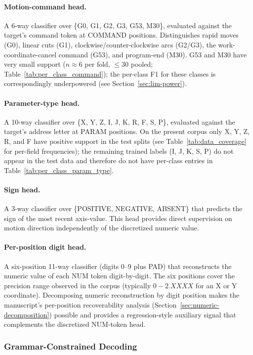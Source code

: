 \documentclass[sensors,article,submit,moreauthors,pdftex]{Definitions/mdpi}
\begin{document}
\paragraph{Motion-command head.} A 6-way classifier over \{G0, G1, G2, G3, G53, M30\}, evaluated against the target's command token at COMMAND positions. Distinguishes rapid moves (G0), linear cuts (G1), clockwise/counter-clockwise arcs (G2/G3), the work-coordinate-cancel command (G53), and program-end (M30). G53 and M30 have very small support ($n\!\approx\!6$ per fold, $\le\!30$ pooled; Table~\ref{tab:per_class_command}); the per-class F1 for these classes is correspondingly underpowered (see Section~\ref{sec:lim-power}).

\paragraph{Parameter-type head.} A 10-way classifier over \{X, Y, Z, I, J, K, R, F, S, P\}, evaluated against the target's address letter at PARAM positions. On the present corpus only X, Y, Z, R, and F have positive support in the test splits (see Table~\ref{tab:data_coverage} for per-field frequencies); the remaining trained labels (I, J, K, S, P) do not appear in the test data and therefore do not have per-class entries in Table~\ref{tab:per_class_param_type}.

\paragraph{Sign head.} A 3-way classifier over \{POSITIVE, NEGATIVE, ABSENT\} that predicts the sign of the most recent axis-value. This head provides direct supervision on motion direction independently of the discretized numeric value.

\paragraph{Per-position digit head.} A six-position 11-way classifier (digits 0--9 plus PAD) that reconstructs the numeric value of each NUM token digit-by-digit. The six positions cover the precision range observed in the corpus (typically $0\!-\!2\!.X\!X\!X\!X$ for an X or Y coordinate). Decomposing numeric reconstruction by digit position makes the manuscript's per-position recoverability analysis (Section~\ref{sec:numeric-decomposition}) possible and provides a regression-style auxiliary signal that complements the discretized NUM-token head.

\subsubsection{Grammar-Constrained Decoding}
\label{sec:grammar}
\end{document}
